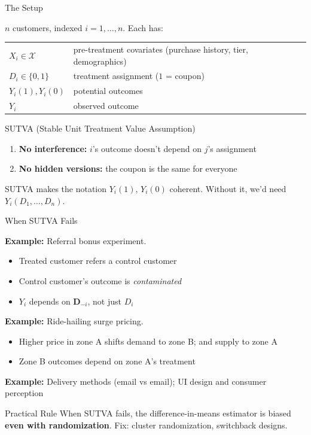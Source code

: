 \documentclass[aspectratio=169, 11pt, handout]{beamer}
\begin{document}
\begin{frame}{The Setup}

$n$ customers, indexed $i = 1, \ldots, n$. Each has:

\bigskip

\begin{tabular}{ll}
$X_i \in \mathcal{X}$ & pre-treatment covariates (purchase history, tier, demographics) \\[0.5em]
$D_i \in \{0, 1\}$ & treatment assignment ($1$ = coupon) \\[0.5em]
$Y_i(1), Y_i(0)$ & potential outcomes \\[0.5em]
$Y_i$ & observed outcome
\end{tabular}

\bigskip

\begin{block}{SUTVA (Stable Unit Treatment Value Assumption)}
\begin{enumerate}
    \item \textbf{No interference:} $i$'s outcome doesn't depend on $j$'s assignment
    \item \textbf{No hidden versions:} the coupon is the same for everyone
\end{enumerate}
\end{block}

SUTVA makes the notation $Y_i(1)$, $Y_i(0)$ coherent. Without it, we'd need $Y_i(D_1, \ldots, D_n)$.
\end{frame}

\begin{frame}{When SUTVA Fails}

\textbf{Example:} Referral bonus experiment.
\begin{itemize}
    \item Treated customer refers a control customer
    \item Control customer's outcome is \emph{contaminated}
    \item $Y_i$ depends on $\mathbf{D}_{-i}$, not just $D_i$
\end{itemize}

\pause

\textbf{Example:} Ride-hailing surge pricing.
\begin{itemize}
    \item Higher price in zone A shifts demand to zone B; and supply to zone A
    \item Zone B outcomes depend on zone A's treatment
\end{itemize}

\pause

\textbf{Example:} Delivery methods (email vs email); UI design and consumer perception

\pause

\bigskip

\begin{alertblock}{Practical Rule}
When SUTVA fails, the difference-in-means estimator is biased \textbf{even with randomization}. Fix: cluster randomization, switchback designs.
\end{alertblock}
\end{frame}
\end{document}
